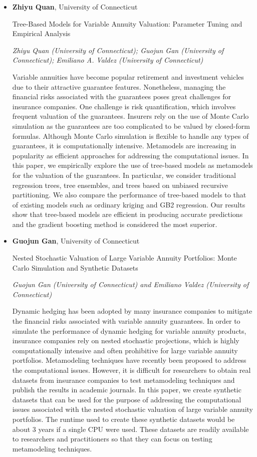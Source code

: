 \begin{itemize}
\item \textbf{Zhiyu Quan}, University of Connecticut

Tree-Based Models for Variable Annuity Valuation: Parameter Tuning and Empirical Analysis

\emph{\footnotesize Zhiyu Quan (University of Connecticut); Guojun Gan (University of Connecticut); Emiliano A. Valdez (University of Connecticut)}

Variable annuities have become popular retirement and investment vehicles due to their attractive guarantee features. Nonetheless, managing the financial risks associated with the guarantees poses great challenges for insurance companies. One challenge is risk quantification, which involves frequent valuation of the guarantees. Insurers rely on the use of Monte Carlo simulation as the guarantees are too complicated to be valued by closed-form formulas. Although Monte Carlo simulation is flexible to handle any types of guarantees, it is computationally intensive. Metamodels are increasing in popularity as efficient approaches for addressing the computational issues. In this paper, we empirically explore the use of tree-based models as metamodels for the valuation of the guarantees. In particular, we consider traditional regression trees, tree ensembles, and trees based on unbiased recursive partitioning. We also compare the performance of tree-based models to that of existing models such as ordinary kriging and GB2 regression. Our results show that tree-based models are efficient in producing accurate predictions and the gradient boosting method is considered the most superior.

\item \textbf{Guojun Gan}, University of Connecticut

Nested Stochastic Valuation of Large Variable Annuity Portfolios: Monte Carlo Simulation and Synthetic Datasets

\emph{\footnotesize Guojun Gan (University of Connecticut) and Emiliano Valdez (University of Connecticut)}

Dynamic hedging has been adopted by many insurance companies to mitigate the financial risks associated with variable annuity guarantees. In order to simulate the performance of dynamic hedging for variable annuity products, insurance companies rely on nested stochastic projections, which is highly computationally intensive and often prohibitive for large variable annuity portfolios. Metamodeling techniques have recently been proposed to address the computational issues. However, it is  difficult for researchers to obtain real datasets from insurance companies to test  metamodeling techniques and publish the results in academic journals. In this paper, we create synthetic datasets that can be used  for the purpose of addressing the computational issues associated with the nested stochastic valuation of large variable annuity portfolios. The runtime used to create these synthetic datasets would be about 3 years if a single CPU were used. These datasets are readily available to researchers and practitioners so that they can focus on testing metamodeling techniques.

\end{itemize}

